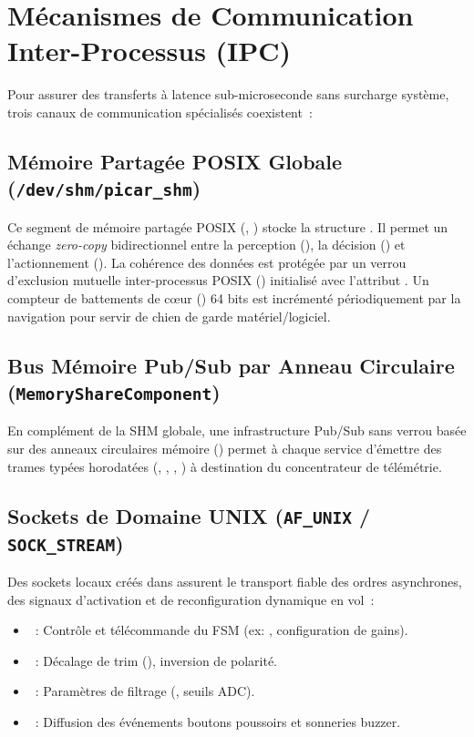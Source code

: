 \section{Mécanismes de Communication Inter-Processus (IPC)}
Pour assurer des transferts à latence sub-microseconde sans surcharge système, trois canaux de communication spécialisés coexistent~:

\subsection{Mémoire Partagée POSIX Globale (\texttt{/dev/shm/picar\_shm})}
Ce segment de mémoire partagée POSIX (, ) stocke la structure . Il permet un échange \emph{zero-copy} bidirectionnel entre la perception (), la décision () et l'actionnement (). 
La cohérence des données est protégée par un verrou d'exclusion mutuelle inter-processus POSIX () initialisé avec l'attribut . Un compteur de battements de cœur () 64 bits est incrémenté périodiquement par la navigation pour servir de chien de garde matériel/logiciel.

\subsection{Bus Mémoire Pub/Sub par Anneau Circulaire (\texttt{MemoryShareComponent})}
En complément de la SHM globale, une infrastructure Pub/Sub sans verrou basée sur des anneaux circulaires mémoire () permet à chaque service d'émettre des trames typées horodatées (, , , ) à destination du concentrateur de télémétrie.

\subsection{Sockets de Domaine UNIX (\texttt{AF\_UNIX} / \texttt{SOCK\_STREAM})}
Des sockets locaux créés dans  assurent le transport fiable des ordres asynchrones, des signaux d'activation et de reconfiguration dynamique en vol~:
\begin{itemize}
    \item {}~: Contrôle et télécommande du FSM (ex: , configuration de gains).
    \item {}~: Décalage de trim (), inversion de polarité.
    \item {}~: Paramètres de filtrage (, seuils ADC).
    \item {}~: Diffusion des événements boutons poussoirs et sonneries buzzer.
\end{itemize}

